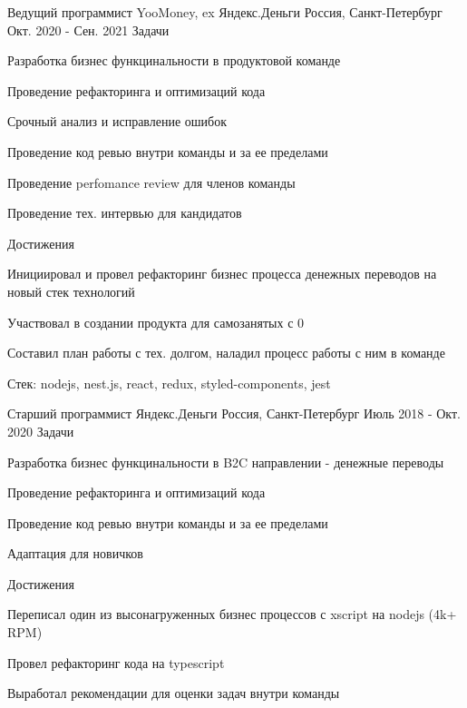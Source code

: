 \begin{cventries}
  \cvmultientry
    {Ведущий программист}
    {YooMoney, ex Яндекс.Деньги}
    {Россия, Санкт-Петербург}
    {Окт. 2020 - Сен. 2021}
    {Задачи}
    {
      \begin{cvitems}
        \item {Разработка бизнес функцинальности в продуктовой команде}
        \item {Проведение рефакторинга и оптимизаций кода}
        \item {Срочный анализ и исправление ошибок}
        \item {Проведение код ревью внутри команды и за ее пределами}
        \item {Проведение perfomance review для членов команды}
        \item {Проведение тех. интервью для кандидатов}
      \end{cvitems}
    }
    {Достижения}
    {
      \begin{cvitems}
        \item {Инициировал и провел рефакторинг бизнес процесса денежных переводов на новый стек технологий}
        \item {Участвовал в создании продукта для самозанятых с 0}
        \item {Составил план работы с тех. долгом, наладил процесс работы с ним в команде}
      \end{cvitems}
    }

    \begin{cvskills}
      \cvskill
        {Стек:}
        {nodejs, nest.js, react, redux, styled-components, jest}
    \end{cvskills}

  \cvmultientry
    {Старший программист}
    {Яндекс.Деньги}
    {Россия, Санкт-Петербург}
    {Июль 2018 - Окт. 2020}
    {Задачи}
    {
      \begin{cvitems}
        \item {Разработка бизнес функцинальности в B2C направлении - денежные переводы}
        \item {Проведение рефакторинга и оптимизаций кода}
        \item {Проведение код ревью внутри команды и за ее пределами}
        \item {Адаптация для новичков}
      \end{cvitems}
    }
    {Достижения}
    {
      \begin{cvitems}
        \item {Переписал один из высонагруженных бизнес процессов с xscript на nodejs (4k+ RPM)}
        \item {Провел рефакторинг кода на typescript}
        \item {Выработал рекомендации для оценки задач внутри команды}
      \end{cvitems}
    }


\end{cventries}
